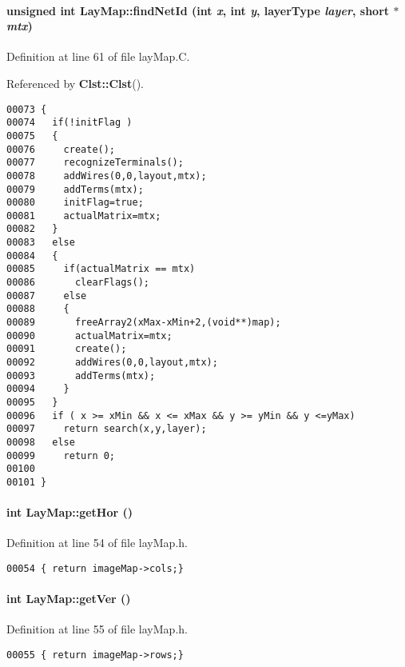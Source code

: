 \paragraph{\setlength{\rightskip}{0pt plus 5cm}unsigned int Lay\-Map::find\-Net\-Id (int {\em x}, int {\em y}, {\bf layer\-Type} {\em layer}, short $\ast$ {\em mtx})}\hfill



Definition at line 61 of file lay\-Map.C.

Referenced by {\bf Clst::Clst}().\small\begin{verbatim}00073 {
00074   if(!initFlag )
00075   {
00076     create();
00077     recognizeTerminals();
00078     addWires(0,0,layout,mtx);
00079     addTerms(mtx);
00080     initFlag=true;
00081     actualMatrix=mtx;
00082   }
00083   else
00084   {
00085     if(actualMatrix == mtx)
00086       clearFlags();
00087     else
00088     {
00089       freeArray2(xMax-xMin+2,(void**)map);
00090       actualMatrix=mtx;
00091       create();
00092       addWires(0,0,layout,mtx);
00093       addTerms(mtx);
00094     }  
00095   }
00096   if ( x >= xMin && x <= xMax && y >= yMin && y <=yMax)
00097     return search(x,y,layer);
00098   else
00099     return 0;
00100 
00101 }
\end{verbatim}\normalsize 
\label{LayMap_a5}
\paragraph{\setlength{\rightskip}{0pt plus 5cm}int Lay\-Map::get\-Hor ()\hspace{0.3cm}{\tt  [inline]}}\hfill



Definition at line 54 of file lay\-Map.h.\small\begin{verbatim}00054 { return imageMap->cols;}
\end{verbatim}\normalsize 
\label{LayMap_a6}
\paragraph{\setlength{\rightskip}{0pt plus 5cm}int Lay\-Map::get\-Ver ()\hspace{0.3cm}{\tt  [inline]}}\hfill



Definition at line 55 of file lay\-Map.h.\small\begin{verbatim}00055 { return imageMap->rows;}
\end{verbatim}\normalsize 
\label{LayMap_c3}
